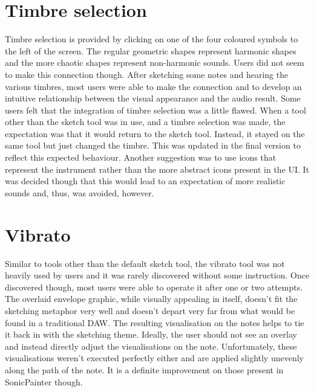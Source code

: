 \documentclass[12pt]{report}
\begin{document}
\section{Timbre selection}
\label{sec:orge47c59c}
Timbre selection is provided by clicking on one of the four coloured symbols to
the left of the screen. The regular geometric shapes represent harmonic shapes
and the more chaotic shapes represent non-harmonic sounds. Users did not seem to
make this connection though. After sketching some notes and hearing the various
timbres, most users were able to make the connection and to develop an intuitive
relationship between the visual appearance and the audio result. Some users felt
that the integration of timbre selection was a little flawed. When a tool other
than the sketch tool was in use, and a timbre selection was made, the
expectation was that it would return to the sketch tool. Instead, it stayed on
the same tool but just changed the timbre. This was updated in the final version
to reflect this expected behaviour. Another suggestion was to use icons that
represent the instrument rather than the more abstract icons present in the UI.
It was decided though that this would lead to an expectation of more realistic
sounds and, thus, was avoided, however.

\section{Vibrato}
\label{sec:org2166e0d}
Similar to tools other than the default sketch tool, the vibrato tool was not
heavily used by users and it was rarely discovered without some instruction.
Once discovered though, most users were able to operate it after one or two
attempts. The overlaid envelope graphic, while visually appealing in itself,
doesn't fit the sketching metaphor very well and doesn't depart very far from
what would be found in a traditional DAW. The resulting visualisation on the
notes helps to tie it back in with the sketching theme. Ideally, the user should
not see an overlay and instead directly adjust the visualisations on the note.
Unfortunately, these visualisations weren't executed perfectly either and are
applied slightly unevenly along the path of the note. It is a definite
improvement on those present in SonicPainter though.
\end{document}
